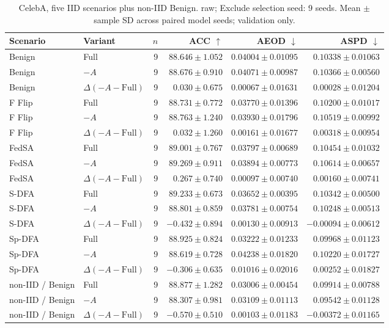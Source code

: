 \begin{table}[t]
\centering
\small
\caption{CelebA, five IID scenarios plus non-IID Benign. raw; Exclude selection seed: 9 seeds. Mean $\pm$ sample SD across paired model seeds; validation only.}
\begin{tabular}{llrrrr}
\toprule
Scenario & Variant & $n$ & ACC $\uparrow$ & AEOD $\downarrow$ & ASPD $\downarrow$ \\
\midrule
Benign & Full & 9 & $88.646 \pm 1.052$ & $0.04004 \pm 0.01095$ & $0.10338 \pm 0.01063$ \\
Benign & $-A$ & 9 & $88.676 \pm 0.910$ & $0.04071 \pm 0.00987$ & $0.10366 \pm 0.00560$ \\
Benign & $\Delta(-A-\mathrm{Full})$ & 9 & $0.030 \pm 0.675$ & $0.00067 \pm 0.01631$ & $0.00028 \pm 0.01204$ \\
F Flip & Full & 9 & $88.731 \pm 0.772$ & $0.03770 \pm 0.01396$ & $0.10200 \pm 0.01017$ \\
F Flip & $-A$ & 9 & $88.763 \pm 1.240$ & $0.03930 \pm 0.01796$ & $0.10519 \pm 0.00992$ \\
F Flip & $\Delta(-A-\mathrm{Full})$ & 9 & $0.032 \pm 1.260$ & $0.00161 \pm 0.01677$ & $0.00318 \pm 0.00954$ \\
FedSA & Full & 9 & $89.001 \pm 0.767$ & $0.03797 \pm 0.00689$ & $0.10454 \pm 0.01032$ \\
FedSA & $-A$ & 9 & $89.269 \pm 0.911$ & $0.03894 \pm 0.00773$ & $0.10614 \pm 0.00657$ \\
FedSA & $\Delta(-A-\mathrm{Full})$ & 9 & $0.267 \pm 0.740$ & $0.00097 \pm 0.00740$ & $0.00160 \pm 0.00741$ \\
S-DFA & Full & 9 & $89.233 \pm 0.673$ & $0.03652 \pm 0.00395$ & $0.10342 \pm 0.00500$ \\
S-DFA & $-A$ & 9 & $88.801 \pm 0.859$ & $0.03781 \pm 0.00754$ & $0.10248 \pm 0.00513$ \\
S-DFA & $\Delta(-A-\mathrm{Full})$ & 9 & $-0.432 \pm 0.894$ & $0.00130 \pm 0.00913$ & $-0.00094 \pm 0.00612$ \\
Sp-DFA & Full & 9 & $88.925 \pm 0.824$ & $0.03222 \pm 0.01233$ & $0.09968 \pm 0.01123$ \\
Sp-DFA & $-A$ & 9 & $88.619 \pm 0.728$ & $0.04238 \pm 0.01820$ & $0.10220 \pm 0.01727$ \\
Sp-DFA & $\Delta(-A-\mathrm{Full})$ & 9 & $-0.306 \pm 0.635$ & $0.01016 \pm 0.02016$ & $0.00252 \pm 0.01827$ \\
non-IID / Benign & Full & 9 & $88.877 \pm 1.282$ & $0.03006 \pm 0.00454$ & $0.09914 \pm 0.00788$ \\
non-IID / Benign & $-A$ & 9 & $88.307 \pm 0.981$ & $0.03109 \pm 0.01113$ & $0.09542 \pm 0.01128$ \\
non-IID / Benign & $\Delta(-A-\mathrm{Full})$ & 9 & $-0.570 \pm 0.510$ & $0.00103 \pm 0.01183$ & $-0.00372 \pm 0.01165$ \\
\bottomrule
\end{tabular}
\end{table}

